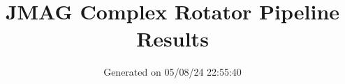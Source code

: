 \documentclass{report}%
\title{JMAG Complex Rotator Pipeline Results}%
\date{Generated on 05/08/24 22:55:40}%
\begin{document}
%
\normalsize%
\maketitle%
\end{document}
